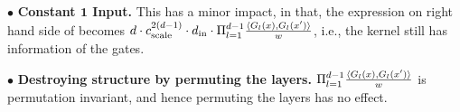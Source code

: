 $\bullet$ \textbf{Constant $\mathbf{1}$ Input.} This has a minor impact, in that, the expression on right hand side of  becomes $d \cdot c_{\text{scale}}^{2(d-1)} \cdot d_{\text{in}} \cdot \Pi_{l=1}^{d-1} \frac{\langle G_l(x),G_l(x')\rangle}w$, i.e., the kernel still has information of the gates.

$\bullet$ \textbf{Destroying structure by permuting the layers.}  $\Pi_{l=1}^{d-1} \frac{\langle G_l(x),G_l(x')\rangle}w$ is permutation invariant, and hence permuting the layers has no effect.





